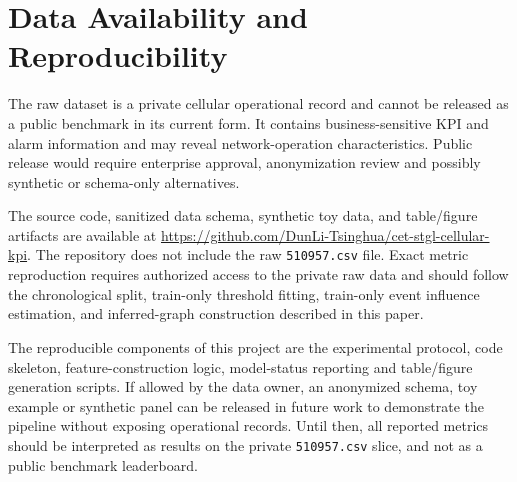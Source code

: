 \section{Data Availability and Reproducibility}

The raw dataset is a private cellular operational record and cannot be released as a public benchmark in its current form. It contains business-sensitive KPI and alarm information and may reveal network-operation characteristics. Public release would require enterprise approval, anonymization review and possibly synthetic or schema-only alternatives.

The source code, sanitized data schema, synthetic toy data, and table/figure artifacts are available at \url{https://github.com/DunLi-Tsinghua/cet-stgl-cellular-kpi}. The repository does not include the raw \texttt{510957.csv} file. Exact metric reproduction requires authorized access to the private raw data and should follow the chronological split, train-only threshold fitting, train-only event influence estimation, and inferred-graph construction described in this paper.

The reproducible components of this project are the experimental protocol, code skeleton, feature-construction logic, model-status reporting and table/figure generation scripts. If allowed by the data owner, an anonymized schema, toy example or synthetic panel can be released in future work to demonstrate the pipeline without exposing operational records. Until then, all reported metrics should be interpreted as results on the private \texttt{510957.csv} slice, and not as a public benchmark leaderboard.
